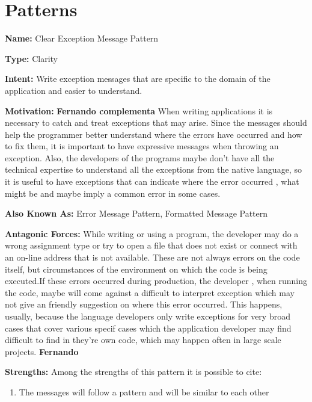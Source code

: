\documentclass[12pt]{article}
\begin{document}
\section{Patterns}
\begin{flushleft}
\textbf{Name:} Clear Exception Message Pattern\newline

\textbf{Type:}  Clarity \newline

\textbf{Intent:} Write exception messages that are specific to the domain of the application and easier to understand.\newline

\textbf{Motivation:} \textbf{Fernando complementa}
When writing applications it is necessary to catch and treat exceptions that may arise. Since the messages should help the programmer better understand where the errors have occurred and how to fix them, it is important to have expressive messages when throwing an exception. 
Also, the developers of the programs maybe don't have all the technical expertise to understand all the exceptions from the native language, so it is useful to have exceptions that can indicate where the error occurred , what might be and maybe imply a common error in some cases.\newline


\textbf{Also Known As:} Error Message Pattern, Formatted Message Pattern\newline

\textbf{Antagonic Forces:} While writing or using a program, the developer may do a wrong assignment type or try to open a file that does not exist or connect with an on-line address that is not available. These are not always errors on the code itself, but circumstances of the environment on which the code is being executed.If these errors occurred during production, the developer , when running the code, maybe will come against a difficult to interpret exception which may not give an friendly suggestion on where this error occurred. This happens, usually, because the language developers only write exceptions for very broad cases that cover various specif cases which the application developer may find difficult to find in they're own code, which may happen often in large scale projects.  \newline 
\textbf{Fernando}

\textbf{Strengths:} 
Among the strengths of this pattern it is possible to cite:
\begin{enumerate}
\item The messages will follow a pattern and will be similar to each other


\end{enumerate}
\end{flushleft}
\end{document}
